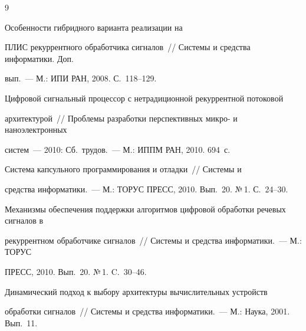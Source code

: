  {\small\frenchspacing


{ %




\begin{thebibliography}{9}


     




 Особенности гибридного варианта реализации на 


ПЛИС рекуррентного обработчика сигналов~/\!\!/ Системы и средства информатики. Доп. 


вып.~--- М.: ИПИ РАН, 2008. С.~118--129. 






Цифровой сигнальный процессор с нетрадиционной рекуррентной потоковой 


архитектурой~/\!\!/ Проблемы разработки перспективных микро- и наноэлектронных 


систем~--- 2010: Сб.\ трудов.~--- М.: ИППМ РАН, 2010. 694~с.




 Система капсульного программирования и отладки~/\!\!/ Системы и 


средства информатики.~--- М.: ТОРУС ПРЕСС, 2010. Вып.~20. №\,1. С.~24--30.






 Механизмы обеспечения поддержки алгоритмов цифровой обработки речевых сигналов в 


рекуррентном обработчике сигналов~/\!\!/ Системы и средства информатики.~---  М.: ТОРУС 


ПРЕСС, 2010. Вып.~20. №\,1. C.~30--46. 




 Динамический подход к выбору архитектуры вычислительных устройств 


обработки сигналов~/\!\!/ Системы и средства информатики.~--- М.: Наука, 2001. Вып.~11. 



\end{thebibliography}}}
